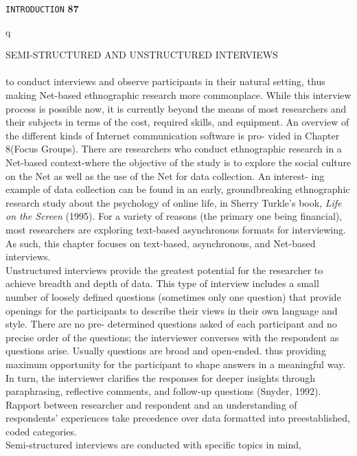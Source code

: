 \documentclass{book}
\begin{document}
\begin{flushright}
\texttt{INTRODUCTION}
\hspace*{0.5cm}
\textbf{87}
\end{flushright}
\vspace*{0.7cm}q

SEMI-STRUCTURED AND UNSTRUCTURED INTERVIEWS
\\
\vspace*{0.1cm}
\\
to conduct interviews and observe participants in their natural setting, thus making
Net-based ethnographic research more commonplace. While this interview process is
possible now, it is currently beyond the means of most researchers and their subjects
in terms of the cost, required skills, and equipment.
An overview of the different kinds of Internet communication software is pro-
vided in Chapter 8(Focus Groups). There are researchers who conduct ethnographic
research in a Net-based context-where the objective of the study is to explore the
social culture on the Net as well as the use of the Net for data collection. An interest-
ing example of data collection can be found in an early, groundbreaking ethnographic
research study about the psychology of online life, in Sherry Turkle's book, \emph{Life on the
Screen} (1995). For a variety of reasons (the primary one being financial), most
researchers are exploring text-based asynchronous formats for interviewing. As such,
this chapter focuses on text-based, asynchronous, and Net-based interviews. \\
Unstructured interviews provide the greatest potential for the researcher to
achieve breadth and depth of data. This type of interview includes a small number of
loosely defined questions (sometimes only one question) that provide openings for the
participants to describe their views in their own language and style. There are no pre-
determined questions asked of each participant and no precise order of the questions;
the interviewer converses with the respondent as questions arise. Usually questions are
broad and open-ended. thus providing maximum opportunity for the participant to
shape answers in a meaningful way. In turn, the interviewer clarifies the responses for
deeper insights through paraphrasing, reflective comments, and follow-up questions
(Snyder, 1992). Rapport between researcher and respondent and an understanding of
respondents' experiences take precedence over data formatted into preestablished,
coded categories. \\
Semi-structured interviews are conducted with specific topics in mind,
\end{document}
